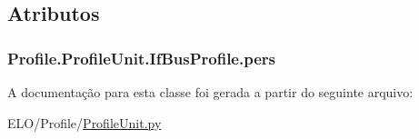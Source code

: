 \subsection{Atributos}
\hypertarget{classProfile_1_1ProfileUnit_1_1IfBusProfile_abe265adaf3fd39d6534f9ad4c9ba8abb}{
\subsubsection[{pers}]{\setlength{\rightskip}{0pt plus 5cm}Profile.\-Profile\-Unit.\-If\-Bus\-Profile.\-pers}}\label{dc/d47/classProfile_1_1ProfileUnit_1_1IfBusProfile_abe265adaf3fd39d6534f9ad4c9ba8abb}


A documentação para esta classe foi gerada a partir do seguinte arquivo\-:\begin{DoxyCompactItemize}
\item 
E\-L\-O/\-Profile/\hyperlink{ProfileUnit_8py}{Profile\-Unit.\-py}\end{DoxyCompactItemize}
